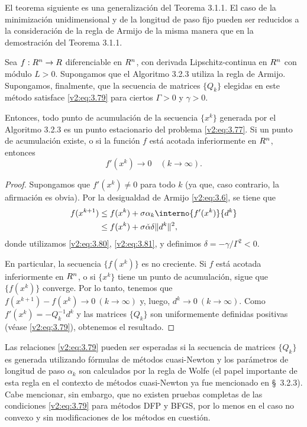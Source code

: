 El teorema siguiente es una generalización del Teorema 3.1.1. El caso de la minimización unidimensional y de la longitud de paso fijo pueden ser reducidos a la consideración de la regla de Armijo de la misma manera que en la demostración del Teorema 3.1.1.

\begin{theorem}\label{v2:thm:3.3.1}
    Sea $f : R^n \to R$ diferenciable en $R^n$, con derivada Lipschitz-continua en $R^n$ con módulo $L > 0$. Supongamos que el Algoritmo 3.2.3 utiliza la regla de Armijo. Supongamos, finalmente, que la secuencia de matrices $\{Q_k\}$ elegidas en este método satisface \eqref{v2:eq:3.79} para ciertos $\Gamma > 0$ y $\gamma > 0$.
    
    Entonces, todo punto de acumulación de la secuencia $\{x^k\}$ generada por el Algoritmo 3.2.3 es un punto estacionario del problema \eqref{v2:eq:3.77}. Si un punto de acumulación existe, o si la función $f$ está acotada inferiormente en $R^n$, entonces
    \[
        f'(x^k) \to 0 \quad (k \to \infty).
    \]
\end{theorem}

\begin{proof}
    Supongamos que $f'(x^k) \neq 0$ para todo $k$ (ya que, caso contrario, la afirmación es obvia).
    Por la desigualdad de Armijo \eqref{v2:eq:3.6}, se tiene que
    \begin{align*}
        f(x^{k+1}) &\le f(x^k) + \sigma \alpha_k \interno{f'(x^k)}{d^k} \\
        &\le f(x^k) + \sigma \check{\alpha} \delta \|d^k\|^2,
    \end{align*}
    donde utilizamos \eqref{v2:eq:3.80}, \eqref{v2:eq:3.81}, y definimos $\delta = -\gamma/\Gamma^2 < 0$.
    
    En particular, la secuencia $\{f(x^k)\}$ es no creciente. Si $f$ está acotada inferiormente en $R^n$, o si $\{x^k\}$ tiene un punto de acumulación, sigue que $\{f(x^k)\}$ converge. Por lo tanto, tenemos que $f(x^{k+1}) - f(x^k) \to 0 \ (k \to \infty)$ y, luego, $d^k \to 0 \ (k \to \infty)$. Como $f'(x^k) = -Q_k^{-1} d^k$ y las matrices $\{Q_k\}$ son uniformemente definidas positivas (véase \eqref{v2:eq:3.79}), obtenemos el resultado.
\end{proof}

Las relaciones \eqref{v2:eq:3.79} pueden ser esperadas si la secuencia de matrices $\{Q_k\}$ es generada utilizando fórmulas de métodos cuasi-Newton y los parámetros de longitud de paso $\alpha_k$ son calculados por la regla de Wolfe (el papel importante de esta regla en el contexto de métodos cuasi-Newton ya fue mencionado en \S~3.2.3). Cabe mencionar, sin embargo, que no existen pruebas completas de las condiciones \eqref{v2:eq:3.79} para métodos DFP y BFGS, por lo menos en el caso no convexo y sin modificaciones de los métodos en cuestión.

